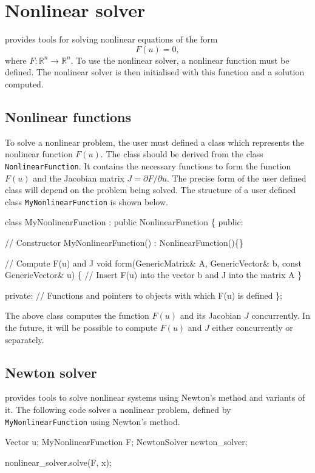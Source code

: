\chapter{Nonlinear solver}

\dolfin{} provides tools for solving nonlinear equations of the form
\begin{equation}
  F(u) = 0, 
\end{equation}
where $F: \mathbb{R}^{n} \rightarrow \mathbb{R}^{n}$. 
To use the nonlinear solver, a nonlinear function must be defined. 
The nonlinear solver is then initialised with this function and a 
solution computed.



\section{Nonlinear functions}

To solve a nonlinear problem, the user must defined a class which 
represents the nonlinear function $F(u)$. The class 
should be derived from the \dolfin{}  class \texttt{NonlinearFunction}. It
contains the necessary functions to form the function $F(u)$ and the 
Jacobian matrix  $J = \partial F / \partial u$. The precise form of the user 
defined class will depend on the problem being solved.
The structure of a user defined class \texttt{MyNonlinearFunction} is shown below.
%
\begin{code}
class MyNonlinearFunction : public NonlinearFunction
\{
  public: 
  
    // Constructor 
    MyNonlinearFunction() : NonlinearFunction()\{\}
  
    // Compute F(u) and J 
    void form(GenericMatrix& A, GenericVector& b, 
              const GenericVector& u)
    \{
      // Insert F(u) into the vector b and J into the matrix A 
    \}

  private:
    // Functions and pointers to objects with which F(u) is defined
\};
\end{code}
%
The above class computes the function $F(u)$ and its Jacobian $J$
concurrently. In the future, it will be possible to compute 
$F(u)$ and $J$ either concurrently or separately.



\section{Newton solver}
%
\dolfin{} provides tools to solve nonlinear systems using Newton's method
and variants of it. The following code solves a nonlinear problem, defined by 
\texttt{MyNonlinearFunction} using Newton's method.
%
\begin{code}
Vector u;
MyNonlinearFunction F;
NewtonSolver newton_solver;

nonlinear_solver.solve(F, x);
\end{code}
%

